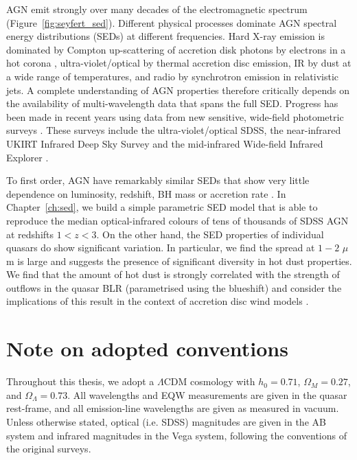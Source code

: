AGN emit strongly over many decades of the electromagnetic spectrum (Figure~\ref{fig:seyfert_sed}). 
Different physical processes dominate AGN spectral energy distributions (SEDs) at different frequencies. 
Hard X-ray emission is dominated by Compton up-scattering of accretion disk photons by electrons in a hot corona \citep[e.g.][]{sunyaev80}, ultra-violet/optical by thermal accretion disc emission, IR by dust at a wide range of temperatures, and radio by synchrotron emission in relativistic jets.   
A complete understanding of AGN properties therefore critically depends on the availability of multi-wavelength data that spans the full SED. 
Progress has been made in recent years using data from new sensitive, wide-field photometric surveys \citep[e.g.][]{roseboom13}. 
These surveys include the ultra-violet/optical SDSS, the near-infrared UKIRT Infrared Deep Sky Survey \citep[UKIDSS;][]{lawrence07} and the mid-infrared Wide-field Infrared Explorer \citep[WISE;][]{wright10}. 

To first order, AGN have remarkably similar SEDs that show very little dependence on luminosity, redshift, BH mass or accretion rate \citep[e.g.][]{elvis12,hao13}. 
In Chapter~\ref{ch:sed}, we build a simple parametric SED model that is able to reproduce the median optical-infrared colours of tens of thousands of SDSS AGN at redshifts $1<z<3$. 
On the other hand, the SED properties of individual quasars do show significant variation.
In particular, we find the spread at $1-2$ $\mu$m is large and suggests the presence of significant diversity in hot dust properties.
We find that the amount of hot dust is strongly correlated with the strength of outflows in the quasar BLR (parametrised using the  blueshift) and consider the implications of this result in the context of accretion disc wind models \citep[e.g.][]{elitzur06}.

\section{Note on adopted conventions}

Throughout this thesis, we adopt a $\Lambda$CDM cosmology with $h_0=0.71$, $\Omega_M=0.27$, and $\Omega_\Lambda=0.73$. 
All wavelengths and EQW measurements are given in the quasar rest-frame, and all emission-line wavelengths are given as measured in vacuum.
Unless otherwise stated, optical (i.e. SDSS) magnitudes are given in the AB system and infrared magnitudes in the Vega system, following the conventions of the original surveys. 
